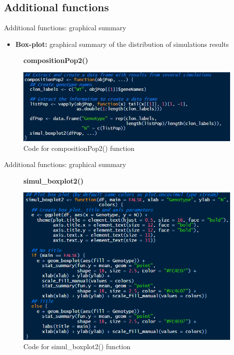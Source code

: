 \subsection{Additional functions}

\begin{frame}{Additional functions: graphical summary}
    \begin{itemize}
        \item \textbf{Box-plot:} graphical summary of the distribution of simulations results
    \end{itemize}
    \textbf{}
    \begin{figure}[t]
        \centering
        \textbf{compositionPop2()}\par\medskip
        \includegraphics[width=0.9\linewidth]{img/compositionPop2.PNG}
        \caption{Code for compositionPop2() function}
    \end{figure}
\end{frame}

\begin{frame}{Additional functions: graphical summary}
    \begin{figure}[t]
        \centering
        \textbf{simul\_boxplot2()}\par\medskip
        \includegraphics[width=0.65\linewidth]{img/simul_boxplot.PNG}
        \caption{Code for simul\_boxplot2() function}
    \end{figure}
\end{frame}

